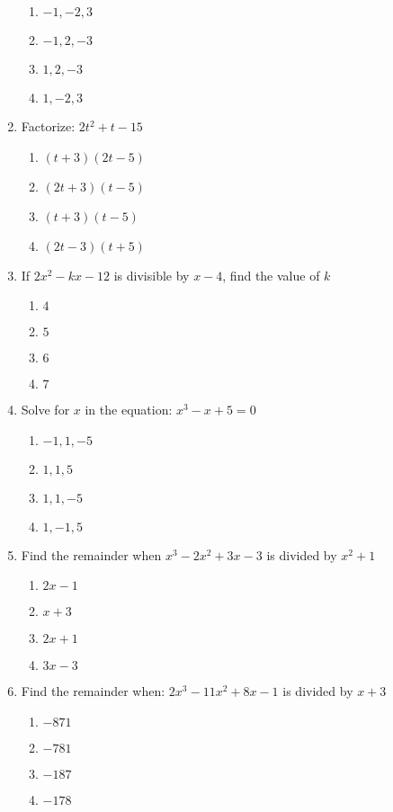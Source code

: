 \begin{multicols}{2}
\begin{enumerate}[label={\arabic*.}]
	\begin{enumerate}[label={\Alph*.}]
	\item \(-1, -2, 3\)
	\item \(-1, 2, -3\)
	\item \(1,2,-3\)
	\item \(1,-2,3\)
	\end{enumerate}
\item Factorize: \(2t^2 + t - 15\)
	\begin{enumerate}[label={\Alph*.}]
	\item \((t+3)(2t-5)\)
	\item \((2t+3)(t-5)\)
	\item \((t+3)(t-5)\)
	\item \((2t-3)(t+5)\)
	\end{enumerate}
\item If \(2x^2 - kx -12\) is divisible by \(x-4\), find the value of \(k\) 
	\begin{enumerate}[label={\Alph*.}]
	\item \(4\)
	\item \(5\)
	\item \(6\)
	\item \(7\)
	\end{enumerate}
\item Solve for $x$ in the equation: $x^3 - x + 5 = 0$
	\begin{enumerate}[label={\Alph*.}]
	\item \(-1, 1, -5\)
	\item \(1,1,5\)
	\item \(1,1,-5\)
	\item \(1,-1,5\)
	\end{enumerate}
\item Find the remainder when $x^3 - 2x^2 + 3x -3$ is divided by $x^2 + 1$ 
	\begin{enumerate}[label={\Alph*.}]
	\item \(2x -1\)
	\item \(x+3\)
	\item \(2x + 1\)
	\item \(3x -3\)
	\end{enumerate}
\item Find the remainder when: $2x^3 -11x^2 + 8x -1$ is divided by $x+3$ 
	\begin{enumerate}[label={\Alph*.}]
	\item \(-871\)
	\item \(-781\)
	\item \(-187\)
	\item \(-178\)

\end{enumerate}
\end{enumerate}
\end{multicols}
